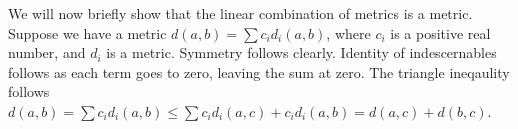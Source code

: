 We will now briefly show that the linear combination of metrics is a metric.
Suppose we have a metric $d(a, b) = \sum c_id_i(a, b)$, 
where $c_i$ is a positive real number, and $d_i$ is a metric.
Symmetry follows clearly.
Identity of indescernables follows as each term goes to zero, leaving the sum at zero.
The triangle ineqaulity follows $d(a, b) = \sum c_id_i(a, b) \le \sum c_id_i(a, c)+c_id_i(a, b) = d(a, c) + d(b, c)$.
